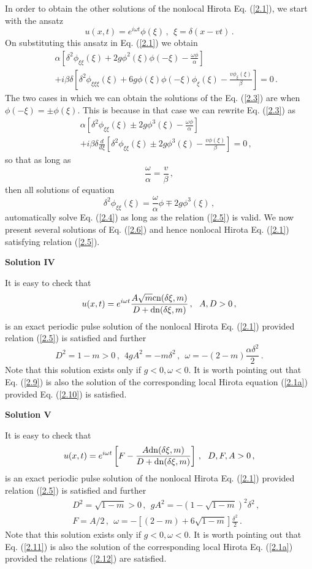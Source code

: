\documentclass[11pt]{article}
\newcommand{\be}{\begin{equation}}
\newcommand{\ee}{\end{equation}}
\newcommand{\bea}{\begin{eqnarray}}
\newcommand{\eea}{\end{eqnarray}}
\newcommand{\dn}{{\rm dn}}
\newcommand{\cn}{{\rm cn}}
\begin{document}
In order to obtain the other solutions of the nonlocal Hirota Eq. (\ref{2.1}),
we start with the ansatz
\be\label{2.2}
u(x,t) = e^{i\omega t} \phi(\xi)\,,~~\xi = \delta(x-vt)\,.
\ee
On substituting this ansatz in Eq. (\ref{2.1}) we obtain
\bea\label{2.3}
&&\alpha\left[\delta^2 \phi_{\xi \xi}(\xi)+2g \phi^2(\xi)\phi(-\xi) 
-\frac{\omega \phi}{\alpha}\right] \nonumber \\
&&+i\beta \delta \left[\delta^2 \phi_{\xi \xi \xi}(\xi) +6g \phi(\xi)
\phi(-\xi) \phi_{\xi}(\xi)- \frac{v \phi_{\xi}(\xi)}{\beta}\right]=0\,.
\eea
The two cases in which we can obtain the solutions of the 
Eq. (\ref{2.3}) are when $\phi(-\xi) = \pm \phi(\xi)$. This is because
in that case we can rewrite Eq. (\ref{2.3}) as 
\bea\label{2.4}
&&\alpha\left[\delta^2 \phi_{\xi \xi}(\xi)\pm 2g \phi^3(\xi) 
-\frac{\omega \phi}{\alpha}\right] \nonumber \\
&&+i\beta \delta \frac{d}{d\xi}\left[\delta^2 \phi_{\xi \xi}(\xi) \pm 2g \phi^3(\xi)
- \frac{v \phi(\xi)}{\beta}\right]=0\,,
\eea
so that as long as
\be\label{2.5}
\frac{\omega}{\alpha} = \frac{v}{\beta}\,,
\ee
then all solutions of equation
\be\label{2.6}
\delta^2 \phi_{\xi \xi}(\xi) = \frac{\omega}{\alpha} \phi \mp 2g \phi^3(\xi)\,,
\ee
automatically solve Eq. (\ref{2.4}) as long as the relation (\ref{2.5}) 
is valid. We now present several solutions of Eq. (\ref{2.6}) and hence
nonlocal Hirota Eq. (\ref{2.1}) satisfying relation (\ref{2.5}).

{\bf Solution IV}

It is easy to check that 
\be\label{2.9}
u(x,t) = e^{i\omega t} \frac{A\sqrt{m}\cn(\delta \xi,m)}
{D+\dn(\delta \xi,m)}\,,~~A, D > 0\,,
\ee
is an exact periodic pulse solution of the nonlocal Hirota Eq. (\ref{2.1}) 
provided relation (\ref{2.5}) is satisfied and further
\be\label{2.10}
D^2 = 1-m > 0\,,~~4g A^2 = -m \delta^2\,,~~\omega 
= -(2-m)\frac{\alpha \delta^2}{2}\,.
\ee
Note that this solution exists only if $g < 0, \omega < 0$. 
It is worth pointing out that Eq. (\ref{2.9}) is also the solution of the 
corresponding local Hirota equation (\ref{2.1a}) provided Eq. (\ref{2.10}) 
is satisfied.

{\bf Solution V}

It is easy to check that 
\be\label{2.11}
u(x,t) = e^{i\omega t}\left[F-\frac{A\dn(\delta \xi,m)}{D+\dn(\delta \xi,m)}\right]\,,
~~D,F,A > 0\,,
\ee
is an exact periodic pulse solution of the nonlocal Hirota Eq. (\ref{2.1}) 
provided relation (\ref{2.5}) is satisfied and further
\bea\label{2.12}
&&D^2 = \sqrt{1-m} > 0\,,~~ g A^2 = -(1-\sqrt{1-m})^2 \delta^2\,,
\nonumber \\
&&F = A/2\,,~~\omega = -[(2-m)+6\sqrt{1-m}]\frac{\delta^2}{2}\,.
\eea
Note that this solution exists only if $g < 0, \omega < 0$. 
It is worth pointing out that Eq. (\ref{2.11}) is also the solution of the 
corresponding local Hirota Eq. (\ref{2.1a}) provided the relations
(\ref{2.12}) are satisfied.
\end{document}
